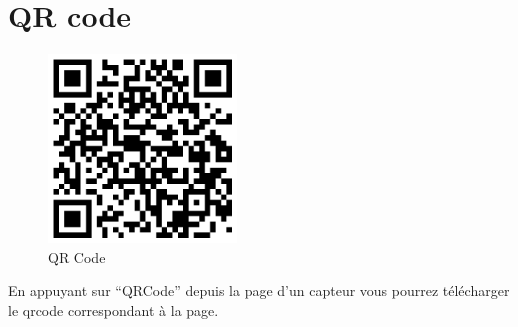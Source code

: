 \section{QR code}\label{sec:qr-code}

    \begin{figure}[H]
        \begin{center}
            \includegraphics[width=5cm]{resources/qr_code}
        \end{center}
        \caption{QR Code}\label{fig:qr-code}
    \end{figure}

    En appuyant sur ``QRCode'' depuis la page d'un capteur vous pourrez télécharger le qrcode correspondant à la page.
